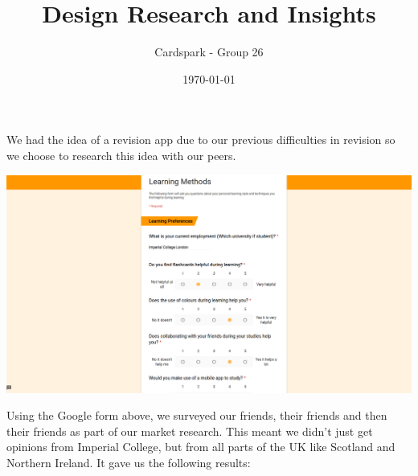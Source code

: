 \documentclass{article}
\begin{document}
\title{Design Research and Insights}
\author{Cardspark - Group 26}
\date{\today}
\maketitle 

We had the idea of a revision app due to our previous difficulties in revision so we choose to research this idea with our peers.

\begin{center}
	\vspace{1mm}
	\includegraphics[scale=0.14]{form.png}
	\vspace{1mm}
\end{center}

Using the Google form above, we surveyed our friends, their friends and then their friends as part of our market research.  This meant we didn't just get opinions from Imperial College, but from all parts of the UK like Scotland and Northern Ireland.  It gave us the following results:
\end{document}
